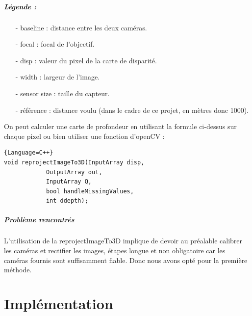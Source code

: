 \documentclass[12pt,a4paper]{report}
\begin{document}
\paragraph{Légende : }
\begin{small}
\begin{enumerate}
\item[-] baseline : distance entre les deux caméras.\\
\item[-] focal : focal de l'objectif.\\
\item[-] disp : valeur du pixel de la carte de disparité.\\
\item[-] width : largeur de l'image.\\
\item[-] sensor size : taille du capteur.\\
\item[-] référence : distance voulu (dans le cadre de ce projet, en mètres donc 1000).\\
\end{enumerate}
\end{small}

On peut calculer une carte de profondeur en utilisant la formule ci-dessus sur chaque pixel ou bien utiliser une fonction d'openCV :  

\begin{lstlisting}{Language=C++}
void reprojectImageTo3D(InputArray disp, 
			OutputArray out, 
			InputArray Q, 
			bool handleMissingValues, 
			int ddepth);
\end{lstlisting}

\paragraph{Problème rencontrés}
L'utilisation de la reprojectImageTo3D implique de devoir au préalable calibrer les caméras et rectifier les images, étapes longue et non obligatoire car les caméras fournis sont suffisamment fiable. Donc nous avons opté pour la première méthode.\\

\chapter{Implémentation}
\end{document}
